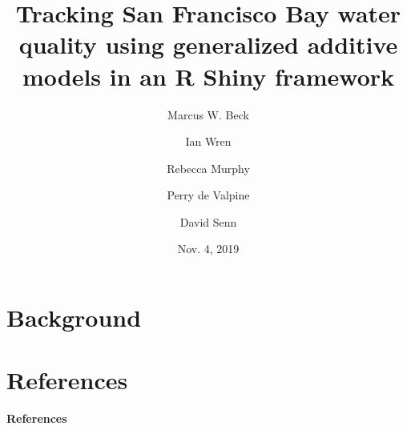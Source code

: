 \documentclass{beamer}
\begin{document}


\title[Tracking SF Bay Water Quality]{Tracking San Francisco Bay water quality using generalized additive models in an R Shiny framework}
\author[Beck et al.]{Marcus W. Beck \and Ian Wren \and Rebecca Murphy \and Perry de Valpine \and David Senn}


\date{Nov. 4, 2019}


\begin{frame}
\titlepage
\end{frame}

\section{Background}


\section{References}
\begin{frame}[t]{\textbf{References}}
% 
% 
\end{frame}
\end{document}
